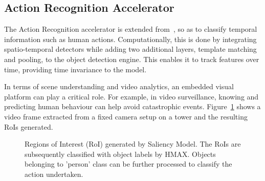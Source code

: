 \subsection{Action Recognition Accelerator}
The Action Recognition accelerator is extended from~\cite{action-recognition}, so as to classify temporal information such as human actions. Computationally, this is done by integrating spatio-temporal detectors while adding two additional layers, template matching and pooling, to the object detection engine. This enables it to track features over time, providing time invariance to the model.

In terms of scene understanding and video analytics, an embedded visual platform can play a critical role. For example, in video surveillance, knowing and predicting human behaviour can help avoid catastrophic events. Figure~\ref{fig:RoIs_campus_000042} shows a video frame extracted from a fixed camera setup on a tower and the resulting RoIs generated.

\begin{figure}[ht!]
\centering
{}
\caption{\label{fig:RoIs_campus_000042} Regions of Interest (RoI) generated by Saliency Model. The RoIs are subsequently classified with object labels by HMAX. Objects belonging to 'person' class can be further processed to classify the action undertaken.}
\end{figure}

